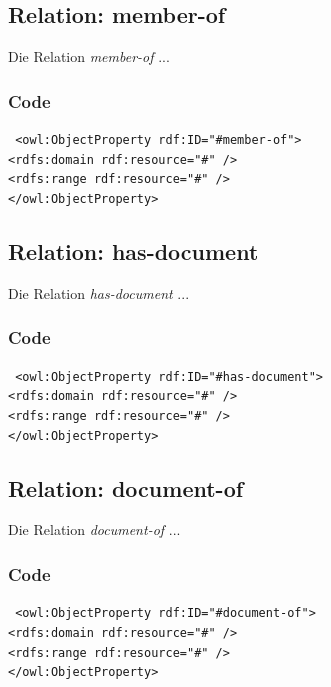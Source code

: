 ﻿\documentclass[
    11pt,
    latin1,
    a4paper,
    oneside
]{scrreprt}
\begin{document}
\subsection{Relation: member-of} \label{sec:rel_memberof}

Die Relation \emph{member-of} ...

\subsubsection{Code} \label{sec:rel_memberof_code}

\texttt{ <owl:ObjectProperty rdf:ID="#member-of"> \\
	<rdfs:domain rdf:resource="#" /> \\
	<rdfs:range rdf:resource="#" /> \\
</owl:ObjectProperty> }


\subsection{Relation: has-document} \label{sec:rel_hasdocument}

Die Relation \emph{has-document} ...

\subsubsection{Code} \label{sec:rel_hasdocument_code}

\texttt{ <owl:ObjectProperty rdf:ID="#has-document"> \\
	<rdfs:domain rdf:resource="#" /> \\
	<rdfs:range rdf:resource="#" /> \\
</owl:ObjectProperty> }


\subsection{Relation: document-of} \label{sec:rel_documentof}

Die Relation \emph{document-of} ...

\subsubsection{Code} \label{sec:rel_documentof_code}

\texttt{ <owl:ObjectProperty rdf:ID="#document-of"> \\
	<rdfs:domain rdf:resource="#" /> \\
	<rdfs:range rdf:resource="#" /> \\
</owl:ObjectProperty> }
\end{document}
